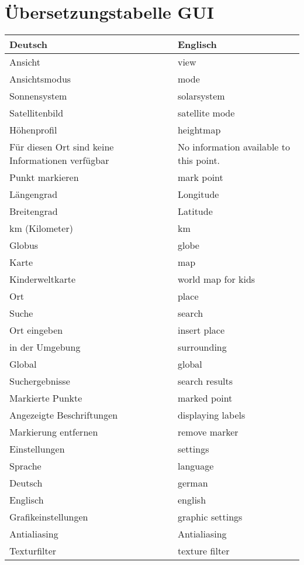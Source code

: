 \documentclass[10pt]{scrreprt}
\begin{document}
\section{Übersetzungstabelle GUI}
\begin{longtable}{|p{7.5cm}|p{7.5cm}|}
\hline 
\textbf{Deutsch} & \textbf{Englisch} \\ 
\hline
\hline 
Ansicht & view \\ 
\hline
Ansichtsmodus & mode \\ 
\hline
Sonnensystem & solarsystem \\
\hline
Satellitenbild & satellite mode \\
\hline
Höhenprofil & heightmap \\
\hline
Für diesen Ort sind keine Informationen verfügbar & No information available to this point. \\
\hline
Punkt markieren & mark point\\
\hline
Längengrad & Longitude \\
\hline
Breitengrad & Latitude \\
\hline
km (Kilometer) & km \\
\hline
Globus & globe \\
\hline
Karte & map \\
\hline
Kinderweltkarte & world map for kids \\
\hline
Ort & place \\
\hline
Suche & search \\
\hline
Ort eingeben & insert place \\
\hline
in der Umgebung & surrounding \\
\hline
Global & global \\
\hline
Suchergebnisse & search results \\
\hline
Markierte Punkte & marked point \\
\hline
Angezeigte Beschriftungen & displaying labels \\
\hline
Markierung entfernen & remove marker \\
\hline
Einstellungen & settings \\
\hline
Sprache & language \\
\hline
Deutsch & german \\
\hline
Englisch & english \\
\hline
Grafikeinstellungen & graphic settings \\
\hline
Antialiasing & Antialiasing \\
\hline
Texturfilter & texture filter \\

\end{longtable}
\end{document}
